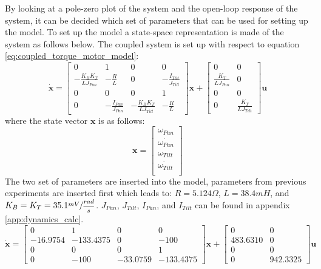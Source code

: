 By looking at a pole-zero plot of the system and the open-loop response of the system, it can be decided which set of parameters that can be used for setting up the model. To set up the model a state-space representation is made of the system as follows below. The coupled system is set up with respect to equation \ref{eq:coupled_torque_motor_model}:
\[
 \dot{\textbf{x}} =
 \begin{bmatrix}
   0 & 1 & 0 & 0\\
   - \frac{K_B K_T}{L J_{Pan}} & - \frac{R}{L} & 0 & - \frac{I_{Tilt}}{J_{Tilt}}\\
   0 & 0 & 0 & 1\\
   0 & - \frac{I_{Pan}}{J_{Pan}} & - \frac{K_B K_T}{L J_{Tilt}} & - \frac{R}{L}
 \end{bmatrix}
 \textbf{x} +
 \begin{bmatrix}
   0 & 0\\
   \frac{K_T}{L J_{Pan}} & 0\\
   0 & 0\\
   0 & \frac{K_T}{L J_{Tilt}}
 \end{bmatrix}
 \textbf{u}
\]
where the state vector $\textbf{x}$ is as follows:
\[
 \textbf{x} =
 \begin{bmatrix}
   \omega_{Pan}\\
   \dot{\omega_{Pan}}\\
   \omega_{Tilt}\\
   \dot{\omega_{Tilt}}\\
 \end{bmatrix}
\]
The two set of parameters are inserted into the model, parameters from previous experiments are inserted first which leads to: $R = 5.124\Omega$, $L = 38.4mH$, and $K_B = K_T = 35.1 \sfrac{mV}{\dfrac{rad}{s}}$. $J_{Pan}$, $J_{Tilt}$, $I_{Pan}$, and $I_{Tilt}$ can be found in appendix \ref{app:dynamics_calc}.
\begin{equation}
 \dot{\textbf{x}} =
 \begin{bmatrix}
   0 & 1 & 0 & 0\\
   - 16.9754 & - 133.4375 & 0 & - 100\\
   0 & 0 & 0 & 1\\
   0 & - 100 & - 33.0759 & - 133.4375
 \end{bmatrix}
 \textbf{x} +
 \begin{bmatrix}
   0 & 0\\
   483.6310 & 0\\
   0 & 0\\
   0 & 942.3325
 \end{bmatrix}
 \textbf{u}\label{eq:crap_ss_model}
\end{equation}
